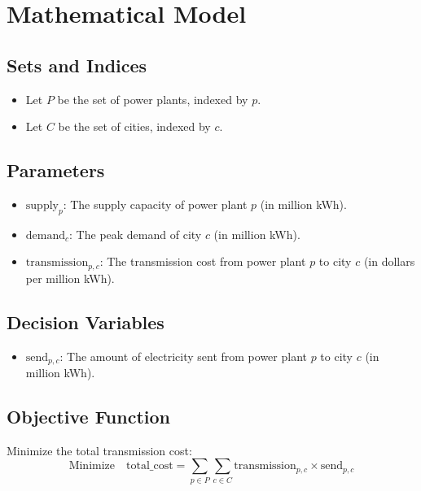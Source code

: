 \documentclass{article}
\begin{document}
\section*{Mathematical Model}

\subsection*{Sets and Indices}
\begin{itemize}
    \item Let \( P \) be the set of power plants, indexed by \( p \).
    \item Let \( C \) be the set of cities, indexed by \( c \).
\end{itemize}

\subsection*{Parameters}
\begin{itemize}
    \item \( \text{supply}_p \): The supply capacity of power plant \( p \) (in million kWh).
    \item \( \text{demand}_c \): The peak demand of city \( c \) (in million kWh).
    \item \( \text{transmission}_{p,c} \): The transmission cost from power plant \( p \) to city \( c \) (in dollars per million kWh).
\end{itemize}

\subsection*{Decision Variables}
\begin{itemize}
    \item \( \text{send}_{p,c} \): The amount of electricity sent from power plant \( p \) to city \( c \) (in million kWh).
\end{itemize}

\subsection*{Objective Function}
Minimize the total transmission cost:
\[
\text{Minimize} \quad \text{total\_cost} = \sum_{p \in P} \sum_{c \in C} \text{transmission}_{p,c} \times \text{send}_{p,c}
\]
\end{document}
